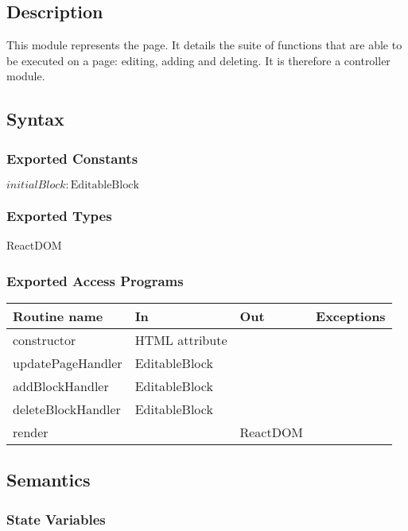 \documentclass[12pt, titlepage]{article}
\begin{document}
\subsection{Description}
This module represents the page. It details the suite of functions that are able to be executed on a page: editing, adding and deleting. It is therefore a controller module.

\subsection{Syntax}

\subsubsection{Exported Constants}

$\mathit{initialBlock}: \text{EditableBlock}$

\subsubsection{Exported Types}

ReactDOM

\subsubsection{Exported Access Programs}

\begin{tabular}{| l | l | l | l |}
  \hline
  \textbf{Routine name} & \textbf{In} & \textbf{Out} & \textbf{Exceptions}\\
  \hline
  constructor & HTML attribute & ~ & ~\\
  \hline
  updatePageHandler & EditableBlock & ~ & ~\\
  \hline
  addBlockHandler & EditableBlock & ~ & ~\\
  \hline
  deleteBlockHandler & EditableBlock & ~ & ~\\
  \hline
  render & ~ & ReactDOM & ~\\
  \hline
\end{tabular}

\subsection{Semantics}

\subsubsection{State Variables}
\end{document}
